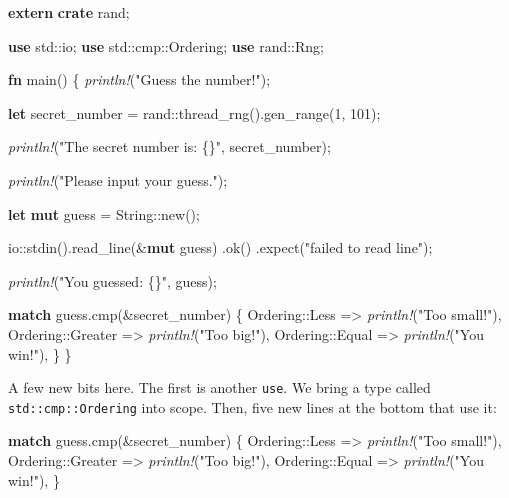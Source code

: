 \documentclass[a4paper,]{book}
\newenvironment{Shaded}{\begin{snugshade}}{\end{snugshade}}
\newcommand{\KeywordTok}[1]{\textcolor[rgb]{0.13,0.29,0.53}{\textbf{{#1}}}}
\newcommand{\DataTypeTok}[1]{\textcolor[rgb]{0.13,0.29,0.53}{{#1}}}
\newcommand{\DecValTok}[1]{\textcolor[rgb]{0.00,0.00,0.81}{{#1}}}
\newcommand{\StringTok}[1]{\textcolor[rgb]{0.31,0.60,0.02}{{#1}}}
\newcommand{\PreprocessorTok}[1]{\textcolor[rgb]{0.56,0.35,0.01}{\textit{{#1}}}}
\newcommand{\NormalTok}[1]{{#1}}
\begin{document}
\begin{Shaded}
\begin{Highlighting}[]
\KeywordTok{extern} \KeywordTok{crate} \NormalTok{rand;}

\KeywordTok{use} \NormalTok{std::io;}
\KeywordTok{use} \NormalTok{std::cmp::Ordering;}
\KeywordTok{use} \NormalTok{rand::Rng;}

\KeywordTok{fn} \NormalTok{main() \{}
    \PreprocessorTok{println!}\NormalTok{(}\StringTok{"Guess the number!"}\NormalTok{);}

    \KeywordTok{let} \NormalTok{secret_number = rand::thread_rng().gen_range(}\DecValTok{1}\NormalTok{, }\DecValTok{101}\NormalTok{);}

    \PreprocessorTok{println!}\NormalTok{(}\StringTok{"The secret number is: \{\}"}\NormalTok{, secret_number);}

    \PreprocessorTok{println!}\NormalTok{(}\StringTok{"Please input your guess."}\NormalTok{);}

    \KeywordTok{let} \KeywordTok{mut} \NormalTok{guess = }\DataTypeTok{String}\NormalTok{::new();}

    \NormalTok{io::stdin().read_line(&}\KeywordTok{mut} \NormalTok{guess)}
        \NormalTok{.ok()}
        \NormalTok{.expect(}\StringTok{"failed to read line"}\NormalTok{);}

    \PreprocessorTok{println!}\NormalTok{(}\StringTok{"You guessed: \{\}"}\NormalTok{, guess);}

    \KeywordTok{match} \NormalTok{guess.cmp(&secret_number) \{}
        \NormalTok{Ordering::Less    => }\PreprocessorTok{println!}\NormalTok{(}\StringTok{"Too small!"}\NormalTok{),}
        \NormalTok{Ordering::Greater => }\PreprocessorTok{println!}\NormalTok{(}\StringTok{"Too big!"}\NormalTok{),}
        \NormalTok{Ordering::Equal   => }\PreprocessorTok{println!}\NormalTok{(}\StringTok{"You win!"}\NormalTok{),}
    \NormalTok{\}}
\NormalTok{\}}
\end{Highlighting}
\end{Shaded}

A few new bits here. The first is another \texttt{use}. We bring a type
called \texttt{std::cmp::Ordering} into scope. Then, five new lines at
the bottom that use it:

\begin{Shaded}
\begin{Highlighting}[]
\KeywordTok{match} \NormalTok{guess.cmp(&secret_number) \{}
    \NormalTok{Ordering::Less    => }\PreprocessorTok{println!}\NormalTok{(}\StringTok{"Too small!"}\NormalTok{),}
    \NormalTok{Ordering::Greater => }\PreprocessorTok{println!}\NormalTok{(}\StringTok{"Too big!"}\NormalTok{),}
    \NormalTok{Ordering::Equal   => }\PreprocessorTok{println!}\NormalTok{(}\StringTok{"You win!"}\NormalTok{),}
\NormalTok{\}}
\end{Highlighting}
\end{Shaded}
\end{document}
